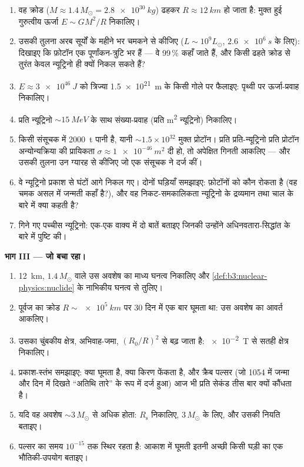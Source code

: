 \begin{problem}
\begin{enumerate}[resume]
  \item वह क्रोड ($M \approx 1.4\,M_\odot = \qty{2.8e30}{kg}$)
        ढहकर $R \approx \qty{12}{km}$ हो जाता है: मुक्त हुई
        गुरुत्वीय ऊर्जा $E \sim GM^2/R$ निकालिए।
  \item उसकी तुलना अरब सूर्यों के महीने भर चमकने से कीजिए
        ($L \sim 10^{9}L_\odot$, $\qty{2.6e6}{s}$ के लिए):
        दिखाइए कि फ़ोटॉन एक पूर्णांकन-त्रुटि भर हैं --- वे
        99\,\% कहाँ जाते हैं, और किसी ढहते क्रोड से तुरंत केवल
        न्यूट्रिनो ही क्यों निकल सकते हैं?
  \item $E \approx \qty{3e46}{J}$ को त्रिज्या
        \qty{1.5e21}{m} के किसी गोले पर फैलाइए: पृथ्वी पर
        ऊर्जा-प्रवाह निकालिए।
  \item प्रति न्यूट्रिनो $\sim\qty{15}{MeV}$ के साथ
        संख्या-प्रवाह (प्रति \unit{m^2} न्यूट्रिनो) निकालिए।
  \item किसी संसूचक में \qty{2000}{t} पानी है, यानी
        ${\sim}1.5\times10^{32}$ मुक्त प्रोटॉन। प्रति
        प्रति-न्यूट्रिनो प्रति प्रोटॉन अन्योन्यक्रिया की प्रायिकता
        $\sigma \approx \qty{1e-46}{m^2}$ दी हो, तो
        अपेक्षित गिनती आकलिए --- और उसकी तुलना उन ग्यारह से कीजिए
        जो एक संसूचक ने दर्ज कीं।
  \item वे न्यूट्रिनो प्रकाश से घंटों आगे निकल गए। दोनों घड़ियाँ
        समझाइए: फ़ोटॉनों को कौन रोकता है (वह चमक असल में जन्मती कहाँ
        है?), और वह
        निकट-समकालिकता न्यूट्रिनो के द्रव्यमान तथा
        चाल के बारे में क्या कहती है?
  \item गिने गए पच्चीस न्यूट्रिनो: एक-एक वाक्य में दो बातें बताइए
        जिनकी उन्होंने अधिनवतारा-सिद्धांत के बारे में पुष्टि की।
\end{enumerate}

\medskip\noindent\textbf{भाग III --- जो बचा रहा।}

\begin{enumerate}[resume]
  \item \qty{12}{km}, $1.4\,M_\odot$ वाले उस अवशेष का माध्य घनत्व
        निकालिए और \cref{def:b3:nuclear-physics:nuclide} के
        नाभिकीय घनत्व से
        तुलिए।
  \item पूर्वज का क्रोड $R \sim \qty{e5}{km}$ पर 30 दिन में एक बार
        घूमता था: उस अवशेष का आवर्त आकलिए।
  \item उसका चुंबकीय क्षेत्र, अभिवाह-जमा, $(R_0/R)^2$ से बढ़ जाता
        है: \qty{e-2}{T} से सतही
        क्षेत्र निकालिए।
  \item प्रकाश-स्तंभ समझाइए: क्या घूमता है, क्या किरण फेंकता है, और
        क्रैब पल्सर (जो 1054 में जन्मा और दिन में दिखते ``अतिथि
        तारे'' के रूप में दर्ज हुआ) आज भी प्रति सेकंड तीस बार क्यों
        कौंधता है।
  \item यदि वह अवशेष ${\sim}3\,M_\odot$ से अधिक होता: $R_{\text{s}}$
        निकालिए, $3\,M_\odot$ के लिए, और उसकी नियति बताइए।
  \item पल्सर का समय $10^{-15}$ तक स्थिर रहता है: आकाश में घूमती
        इतनी अच्छी किसी घड़ी का एक भौतिकी-उपयोग बताइए।
\end{enumerate}


\end{problem}
